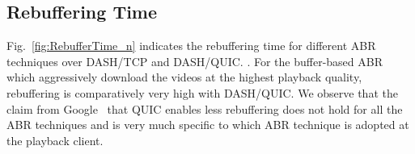 
%

\subsection{Rebuffering Time}
Fig.~\ref{fig:RebufferTime_n} indicates the rebuffering time for different ABR techniques over DASH/TCP and DASH/QUIC. . For the buffer-based ABR which aggressively download the videos at the highest playback quality, rebuffering is comparatively very high with DASH/QUIC.  We observe that the claim from Google~\cite{langley2017quic} that QUIC enables less rebuffering does not hold for all the ABR techniques and is very much specific to which ABR technique is adopted at the playback client.  


